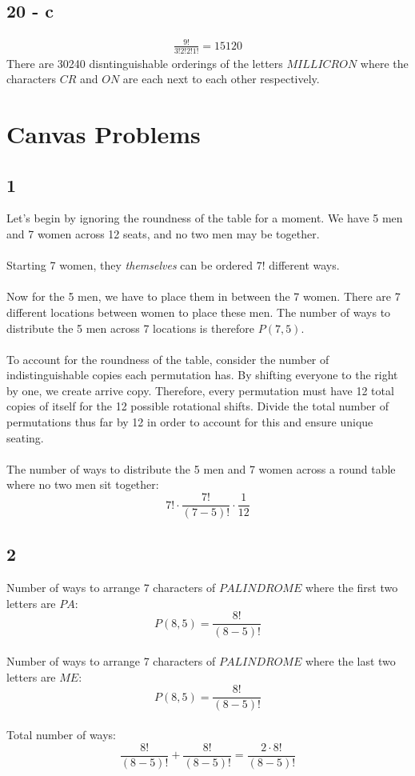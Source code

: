 \documentclass[12pt]{article}
\begin{document}
\subsection*{20 - c}
\begin{align*}
  \frac{9!}{3!2!2!1!} = 15120
\end{align*}
There are 30240 disntinguishable orderings of the letters $MILLICRON$ where the characters $CR$ and $ON$ are each next to each other respectively.
\section*{Canvas Problems}
\subsection*{1}
Let's begin by ignoring the roundness of the table for a moment. 
We have 5 men and 7 women across 12 seats, and no two men may be together.
\\ \\
Starting 7 women, they \textit{themselves} can be ordered $7!$ different ways.
\\ \\
Now for the 5 men, we have to place them in between the 7 women. 
There are 7 different locations between women to place these men.
The number of ways to distribute the 5 men across 7 locations is therefore $P(7, 5)$.
\\ \\
To account for the roundness of the table, consider the number of indistinguishable copies each permutation has. 
By shifting everyone to the right by one, we create arrive copy.
Therefore, every permutation must have 12 total copies of itself for the 12 possible rotational shifts. 
Divide the total number of permutations thus far by 12 in order to account for this and ensure unique seating.
\\ \\
The number of ways to distribute the 5 men and 7 women across a round table where no two men sit together:
\\
$$7! \cdot \frac{7!}{(7-5)!} \cdot \frac{1}{12} $$ 

\subsection*{2}
Number of ways to arrange 7 characters of $PALINDROME$ where the first two letters are $PA$:
\\
$$P(8, 5) = \frac{8!}{(8-5)!}$$
\\
Number of ways to arrange 7 characters of $PALINDROME$ where the last two letters are $ME$:
\\
$$P(8, 5) = \frac{8!}{(8-5)!}$$
\\
Total number of ways:
\\
$$\frac{8!}{(8-5)!} + \frac{8!}{(8-5)!} = \frac{2\cdot8!}{(8-5)!}$$
\end{document}
